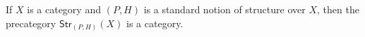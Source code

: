 \documentclass[hott-all.tex]{subfiles}
\begin{document}

\begin{thm}\label{thm:sip}
  If $X$ is a category and $(P,H)$ is a standard notion of structure over $X$, then the precategory $\mathsf{Str}_{(P,H)}(X)$ is a category.
\end{thm}
%
\end{document}
